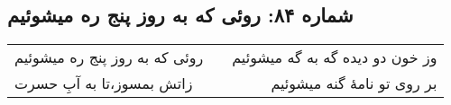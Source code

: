 \begin{center}
\section*{شماره ۸۴: روئی که به روز پنج ره میشوئیم}
\label{sec:084}
\begin{longtable}{l p{0.5cm} r}
روئی که به روز پنج ره میشوئیم
&&
وز خون دو دیده گه به گه میشوئیم
\\
زاتش بمسوز،‌تا به آبِ حسرت
&&
بر روی تو نامهٔ گنه میشوئیم
\\
\end{longtable}
\end{center}

